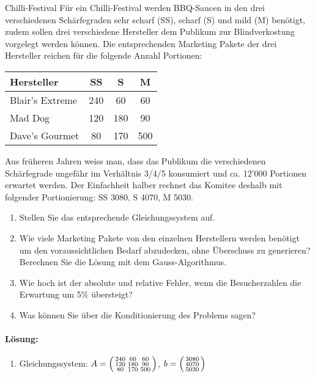 \begin{example2}{Chilli-Festival}
Für ein Chilli-Festival werden BBQ-Saucen in den drei verschiedenen Schärfegraden sehr scharf (SS), scharf (S) und mild (M) benötigt, zudem sollen drei verschiedene Hersteller dem Publikum zur Blindverkostung vorgelegt werden können. Die entsprechenden Marketing Pakete der drei Hersteller reichen für die folgende Anzahl Portionen:

\begin{center}
\begin{tabular}{l|ccc}
Hersteller & SS & S & M \\\hline
Blair's Extreme & 240 & 60 & 60\\
Mad Dog & 120 & 180 & 90\\
Dave's Gourmet & 80 & 170 & 500
\end{tabular}
\end{center}

Aus früheren Jahren weiss man, dass das Publikum die verschiedenen Schärfegrade ungefähr im Verhältnis 3/4/5 konsumiert und ca. 12'000 Portionen erwartet werden. Der Einfachheit halber rechnet das Komitee deshalb mit folgender Portionierung: SS 3080, S 4070, M 5030.
\begin{enumerate}
    \item Stellen Sie das entsprechende Gleichungssystem auf.
    \item Wie viele Marketing Pakete von den einzelnen Herstellern werden benötigt um den voraussichtlichen Bedarf abzudecken, ohne Überschuss zu generieren? Berechnen Sie die Lösung mit dem Gauss-Algorithmus.
    \item Wie hoch ist der absolute und relative Fehler, wenn die Besucherzahlen die Erwartung um 5\% übersteigt?
    \item Was können Sie über die Konditionierung des Problems sagen?
\end{enumerate}
\paragraph{Lösung:}
\begin{enumerate}
    \item Gleichungssystem:
    $A = \begin{psmallmatrix}
    240 & 60 & 60\\
    120 & 180 & 90\\
    80 & 170 & 500
    \end{psmallmatrix}$,
    $b = \begin{psmallmatrix}
    3080\\
    4070\\
    5030
    \end{psmallmatrix}$
    

\end{enumerate}
\end{example2}

